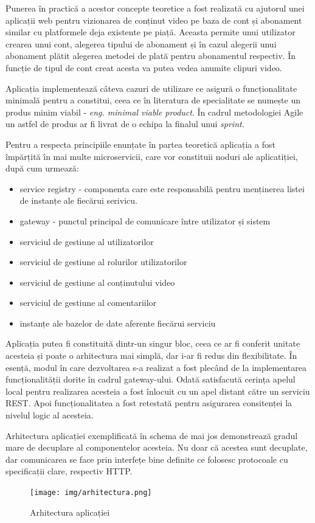 \documentclass[12pt, a4paper, oneside, romanian]{teza-upb}
\begin{document}
Punerea în practică a acestor concepte teoretice a fost realizată cu ajutorul unei aplicații web pentru vizionarea de conținut video pe baza de cont și abonament similar cu platformele deja existente pe piață. Aceasta permite unui utilizator crearea unui cont, alegerea tipului de abonament și în cazul alegerii unui abonament plătit alegerea metodei de plată pentru abonamentul respectiv. În funcție de tipul de cont creat acesta va putea vedea anumite clipuri video.

Aplicația implementează câteva cazuri de utilizare ce asigură o funcționalitate minimală pentru a constitui, ceea ce în literatura de specialitate se numește un produs minim viabil - \textit{eng. minimal viable product}. În cadrul metodologiei Agile un astfel de produs ar fi livrat de o echipa la finalul unui \textit{sprint}.

Pentru a respecta principiile enunțate în partea teoretică aplicația a fost împărțită în mai multe microservicii, care vor constituii noduri ale aplicatiției, după cum urmează:
\begin{itemize}
	\item service registry - componenta care este responsabilă pentru menținerea listei de instanțe ale fiecărui serivicu.
	\item gateway - punctul principal de comunicare între utilizator și sistem
	\item serviciul de gestiune al utilizatorilor
	\item serviciul de gestiune al rolurilor utilizatorilor
	\item serviciul de gestiune al conținutului video
	\item serviciul de gestiune al comentariilor
	\item instanțe ale bazelor de date aferente fiecărui serviciu
\end{itemize}

Aplicația putea fi constituită dintr-un singur bloc, ceea ce ar fi conferit unitate acesteia și poate o arhitectura mai simplă, dar i-ar fi redus din flexibilitate. În esență, modul în care dezvoltarea s-a realizat a fost plecând de la implementarea funcționalității dorite în cadrul gateway-ului. Odată satisfacută cerința apelul local pentru realizarea acesteia a fost înlocuit cu un apel distant către un serviciu REST. Apoi funcționalitatea a fost retestată pentru asigurarea consitenței la nivelul logic al acesteia.

Arhitectura aplicației exemplificată în schema de mai jos demonstrează gradul mare de decuplare al componentelor acesteia. Nu doar că acestea sunt decuplate, dar comunicarea se face prin interfețe bine definite ce folosesc protocoale cu specificații clare, respectiv HTTP. 
\newpage
\begin{figure}[ht]
\centering
\texttt{[image: img/arhitectura.png]}
\caption{Arhitectura aplicației}
\label{fig:arhi_componente}
\end{figure}
\end{document}
